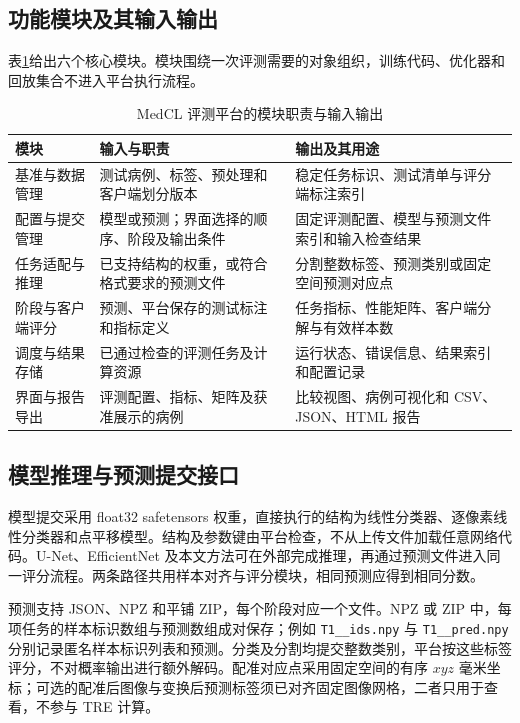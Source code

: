 \subsection{功能模块及其输入输出}
\label{subsec:medcl-modules}

表\ref{tab:medcl-modules}给出六个核心模块。模块围绕一次评测需要的对象组织，训练代码、优化器和回放集合不进入平台执行流程。

\begin{table}[htbp]
\centering
\caption{MedCL 评测平台的模块职责与输入输出}
\label{tab:medcl-modules}
\thesistablefont
\setlength{\tabcolsep}{3pt}
\renewcommand{\arraystretch}{1.14}
\begin{tabularx}{\textwidth}{@{}p{2.2cm}XX@{}}
\toprule
模块 & 输入与职责 & 输出及其用途 \\
\midrule
基准与数据管理 & 测试病例、标签、预处理和客户端划分版本 & 稳定任务标识、测试清单与评分端标注索引 \\
配置与提交管理 & 模型或预测；界面选择的顺序、阶段及输出条件 & 固定评测配置、模型与预测文件索引和输入检查结果 \\
任务适配与推理 & 已支持结构的权重，或符合格式要求的预测文件 & 分割整数标签、预测类别或固定空间预测对应点 \\
阶段与客户端评分 & 预测、平台保存的测试标注和指标定义 & 任务指标、性能矩阵、客户端分解与有效样本数 \\
调度与结果存储 & 已通过检查的评测任务及计算资源 & 运行状态、错误信息、结果索引和配置记录 \\
界面与报告导出 & 评测配置、指标、矩阵及获准展示的病例 & 比较视图、病例可视化和 CSV、JSON、HTML 报告 \\
\bottomrule
\end{tabularx}
\end{table}

\subsection{模型推理与预测提交接口}
\label{subsec:medcl-interfaces}

模型提交采用 float32 safetensors 权重，直接执行的结构为线性分类器、逐像素线性分类器和点平移模型。结构及参数键由平台检查，不从上传文件加载任意网络代码。U-Net、EfficientNet 及本文方法可在外部完成推理，再通过预测文件进入同一评分流程。两条路径共用样本对齐与评分模块，相同预测应得到相同分数。

预测支持 JSON、NPZ 和平铺 ZIP，每个阶段对应一个文件。NPZ 或 ZIP 中，每项任务的样本标识数组与预测数组成对保存；例如 \texttt{T1\_\_ids.npy} 与 \texttt{T1\_\_pred.npy} 分别记录匿名样本标识列表和预测。分类及分割均提交整数类别，平台按这些标签评分，不对概率输出进行额外解码。配准对应点采用固定空间的有序 $xyz$ 毫米坐标；可选的配准后图像与变换后预测标签须已对齐固定图像网格，二者只用于查看，不参与 TRE 计算。

